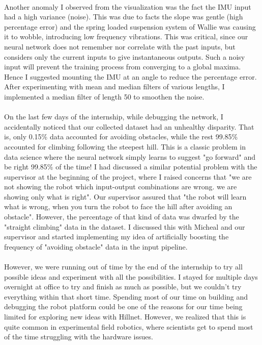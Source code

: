 \paragraph{}
Another anomaly I observed from the visualization was the fact the IMU input had a high variance (noise). This was due to facts the slope was gentle (high percentage error) and the spring loaded suspension system of Wallie was causing it to wobble, introducing low frequency vibrations. This was critical, since our neural network does not remember nor correlate with the past inputs, but considers only the current inputs to give instantaneous outputs. Such a noisy input will prevent the training process from converging to a global maxima. Hence I suggested mounting the IMU at an angle to reduce the percentage error. After experimenting with mean and median filters of various lengths, I implemented a median filter of length 50 to smoothen the noise.

\paragraph{}
On the last few days of the internship, while debugging the network, I accidentally noticed that our collected dataset had an unhealthy disparity. That is, only 0.15\% data accounted for avoiding obstacles, while the rest 99.85\% accounted for climbing following the steepest hill. This is a classic problem in data science where the neural network simply learns to suggest "go forward" and be right 99.85\% of the time! I had discussed a similar potential problem with the supervisor at the beginning of the project, where I raised concerns that "we are not showing the robot which input-output combinations are wrong. we are showing only what is right". Our supervisor assured that "the robot will learn what is wrong, when you turn the robot to face the hill after avoiding an obstacle". However, the percentage of that kind of data was dwarfed by the "straight climbing" data in the dataset. I discussed this with Micheal and our supervisor and started implementing my idea of artificially boosting the frequency of "avoiding obstacle" data in the input pipeline.

\paragraph{}
However, we were running out of time by the end of the internship to try all possible ideas and experiment with all the possibilities. I stayed for multiple days overnight at office to try and finish as much as possible, but we couldn't try everything within that short time. Spending most of our time on building and debugging the robot platform could be one of the reasons for our time being limited for exploring new ideas with Hillnet. However, we realized that this is quite common in experimental field robotics, where scientists get to spend most of the time struggling with the hardware issues. 